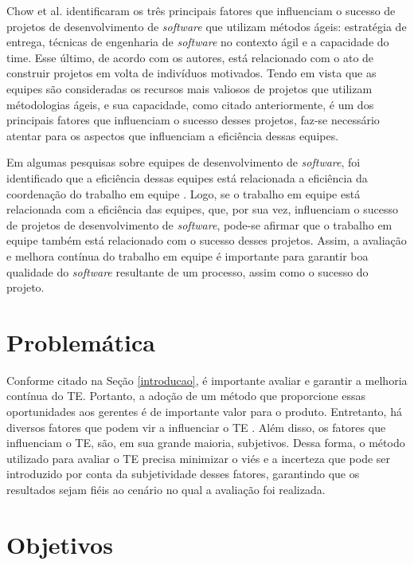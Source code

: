 Chow et al. \cite{chow} identificaram os três principais fatores que influenciam o sucesso de projetos de desenvolvimento de \textit{software} que utilizam métodos ágeis: estratégia de entrega, técnicas de engenharia de \textit{software} no contexto ágil e a capacidade do time. Esse último, de acordo com os autores, está relacionado com o ato de construir projetos em volta de indivíduos motivados. Tendo em vista que as equipes são consideradas os recursos mais valiosos de projetos que utilizam métodologias ágeis, e sua capacidade, como citado anteriormente, é um dos principais fatores que influenciam o sucesso desses projetos, faz-se necessário atentar para os aspectos que influenciam a eficiência dessas equipes.

Em algumas pesquisas sobre equipes de desenvolvimento de \textit{software}, foi identificado que a eficiência dessas equipes está relacionada a eficiência da coordenação do trabalho em equipe \cite{kraut} \cite{hoegl}. Logo, se o trabalho em equipe está relacionada com a eficiência das equipes, que, por sua vez, influenciam o sucesso de projetos de desenvolvimento de \textit{software}, pode-se afirmar que o trabalho em equipe também está relacionado com o sucesso desses projetos. Assim, a avaliação e melhora contínua do trabalho em equipe é importante para garantir boa qualidade do \textit{software} resultante de um processo, assim como o sucesso do projeto.

\section{Problemática}
\label{introducao:problematica}

Conforme citado na Seção \ref{introducao}, é importante avaliar e garantir a melhoria contínua do TE. Portanto, a adoção de um método que proporcione essas oportunidades aos gerentes é de importante valor para o produto. Entretanto, há diversos fatores que podem vir a influenciar o TE \cite{}. Além disso, os fatores que influenciam o TE, são, em sua grande maioria, subjetivos. Dessa forma, o método utilizado para avaliar o TE precisa minimizar o viés e a incerteza que pode ser introduzido por conta da subjetividade desses fatores, garantindo que os resultados sejam fiéis ao cenário no qual a avaliação foi realizada.

\section{Objetivos}
\label{introducao:objetivos}

